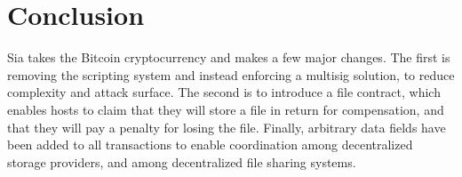 \documentclass[twocolumn]{article}
\begin{document}





\section{Conclusion}
Sia takes the Bitcoin cryptocurrency and makes a few major changes.
The first is removing the scripting system and instead enforcing a multisig solution, to reduce complexity and attack surface.
The second is to introduce a file contract, which enables hosts to claim that they will store a file in return for compensation, and that they will pay a penalty for losing the file.
Finally, arbitrary data fields have been added to all transactions to enable coordination among decentralized storage providers, and among decentralized file sharing systems.
\end{document}
